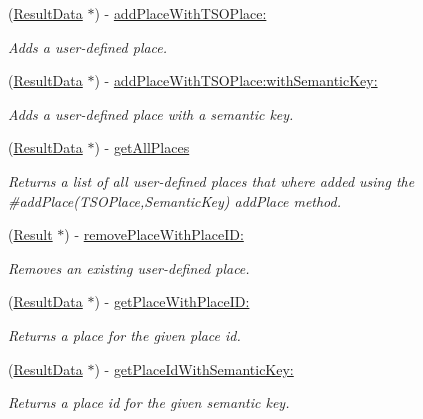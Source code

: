 \begin{DoxyCompactItemize}
\item 
(\hyperlink{interface_result_data}{Result\+Data} $\ast$) -\/ \hyperlink{protocol_i_place_repo-p_a7287f4f8513ef05dc8d4e3be8dbe5192}{add\+Place\+With\+T\+S\+O\+Place\+:}
\begin{DoxyCompactList}\small\item\em Adds a user-\/defined place. \end{DoxyCompactList}\item 
(\hyperlink{interface_result_data}{Result\+Data} $\ast$) -\/ \hyperlink{protocol_i_place_repo-p_a9efb316619dde4e2c0ab846ee804b18c}{add\+Place\+With\+T\+S\+O\+Place\+:with\+Semantic\+Key\+:}
\begin{DoxyCompactList}\small\item\em Adds a user-\/defined place with a semantic key. \end{DoxyCompactList}\item 
(\hyperlink{interface_result_data}{Result\+Data} $\ast$) -\/ \hyperlink{protocol_i_place_repo-p_a2d63c8ae45e3615a734a35193fb1da9c}{get\+All\+Places}
\begin{DoxyCompactList}\small\item\em Returns a list of all user-\/defined places that where added using the \#add\+Place(\+T\+S\+O\+Place,\+Semantic\+Key) add\+Place method. \end{DoxyCompactList}\item 
(\hyperlink{interface_result}{Result} $\ast$) -\/ \hyperlink{protocol_i_place_repo-p_a206c249746fdc45de38c5aad22008454}{remove\+Place\+With\+Place\+I\+D\+:}
\begin{DoxyCompactList}\small\item\em Removes an existing user-\/defined place. \end{DoxyCompactList}\item 
(\hyperlink{interface_result_data}{Result\+Data} $\ast$) -\/ \hyperlink{protocol_i_place_repo-p_a08a96b7e839e5bc2e87649fd1b132686}{get\+Place\+With\+Place\+I\+D\+:}
\begin{DoxyCompactList}\small\item\em Returns a place for the given place id. \end{DoxyCompactList}\item 
(\hyperlink{interface_result_data}{Result\+Data} $\ast$) -\/ \hyperlink{protocol_i_place_repo-p_a89001b700ad8d1b0cc1a78bba913ce9c}{get\+Place\+Id\+With\+Semantic\+Key\+:}
\begin{DoxyCompactList}\small\item\em Returns a place id for the given semantic key. \end{DoxyCompactList}\end{DoxyCompactItemize}


